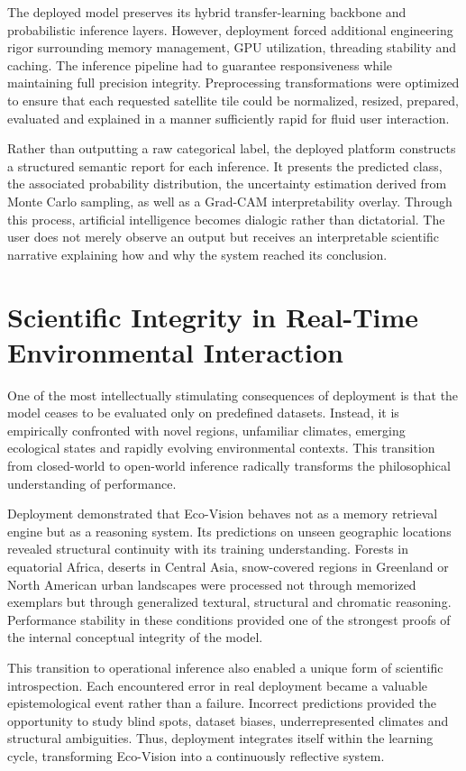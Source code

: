 \documentclass[12pt,a4paper]{report}
\begin{document}
The deployed model preserves its hybrid transfer-learning backbone and probabilistic inference layers. However, deployment forced additional engineering rigor surrounding memory management, GPU utilization, threading stability and caching. The inference pipeline had to guarantee responsiveness while maintaining full precision integrity. Preprocessing transformations were optimized to ensure that each requested satellite tile could be normalized, resized, prepared, evaluated and explained in a manner sufficiently rapid for fluid user interaction.

Rather than outputting a raw categorical label, the deployed platform constructs a structured semantic report for each inference. It presents the predicted class, the associated probability distribution, the uncertainty estimation derived from Monte Carlo sampling, as well as a Grad-CAM interpretability overlay. Through this process, artificial intelligence becomes dialogic rather than dictatorial. The user does not merely observe an output but receives an interpretable scientific narrative explaining how and why the system reached its conclusion.

\section{Scientific Integrity in Real-Time Environmental Interaction}

One of the most intellectually stimulating consequences of deployment is that the model ceases to be evaluated only on predefined datasets. Instead, it is empirically confronted with novel regions, unfamiliar climates, emerging ecological states and rapidly evolving environmental contexts. This transition from closed-world to open-world inference radically transforms the philosophical understanding of performance.

Deployment demonstrated that Eco-Vision behaves not as a memory retrieval engine but as a reasoning system. Its predictions on unseen geographic locations revealed structural continuity with its training understanding. Forests in equatorial Africa, deserts in Central Asia, snow-covered regions in Greenland or North American urban landscapes were processed not through memorized exemplars but through generalized textural, structural and chromatic reasoning. Performance stability in these conditions provided one of the strongest proofs of the internal conceptual integrity of the model.

This transition to operational inference also enabled a unique form of scientific introspection. Each encountered error in real deployment became a valuable epistemological event rather than a failure. Incorrect predictions provided the opportunity to study blind spots, dataset biases, underrepresented climates and structural ambiguities. Thus, deployment integrates itself within the learning cycle, transforming Eco-Vision into a continuously reflective system.
\end{document}
